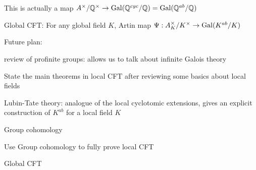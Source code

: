 \documentclass[main]{subfiles}
\begin{document}
\begin{exercise}
This is actually a map $A^\times/\mathbb Q^\times\to\operatorname{Gal}(\mathbb Q^{cyc}/\mathbb Q)=\operatorname{Gal}(\mathbb Q^{ab}/\mathbb Q)$
\end{exercise}

Global CFT: For any global field $K$, Artin map $\Psi:A_K^\times/K^\times\to\operatorname{Gal}(K^{ab}/K)$

Future plan:

review of profinite groups: allows us to talk about infinite Galois theory

State the main theorems in local CFT after reviewing some basics about local fields

Lubin-Tate theory: analogue of the local cyclotomic extensions, gives an explicit construction of $K^{ab}$ for a local field $K$

Group cohomology

Use Group cohomology to fully prove local CFT

Global CFT
\end{document}
